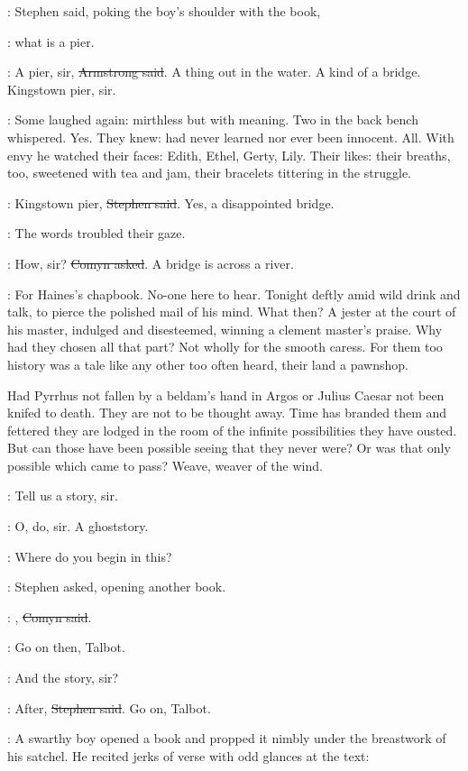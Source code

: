 :
Stephen said, poking the boy's shoulder with the book,

\Stephen:
what is a pier.

\armstrong:
A pier, sir, \sout{Armstrong said}.
A thing out in the water.
A kind of a bridge.
Kingstown pier, sir.


:
Some laughed again: mirthless but with meaning.
Two in the back bench whispered.
Yes.
They knew: had never learned nor ever been innocent.
All.
With envy he watched their faces: Edith, Ethel, Gerty, Lily.
Their likes: their breaths, too,
sweetened with tea and jam,
their bracelets tittering in the struggle.

\Stephen:
Kingstown pier, \sout{Stephen said}.
Yes, a disappointed bridge.

:
The words troubled their gaze.

\comyn:
How, sir?
\sout{Comyn asked}.
A bridge is across a river.

\StephenInt:
For Haines's chapbook.
No-one here to hear.
Tonight deftly amid wild drink and talk,
to pierce the polished mail of his mind.
What then?
A jester at the court of his master, 
indulged and disesteemed,
winning a clement master's praise.
Why had they chosen all that part?
Not wholly for the smooth caress.
For them too history was a tale like any other too often heard,
their land a pawnshop.

Had Pyrrhus not fallen by a beldam's hand in Argos
or Julius Caesar not been knifed to death.
They are not to be thought away.
Time has branded them
and fettered they are lodged in the room of the infinite possibilities
they have ousted.
But can those have been possible
seeing that they never were?
Or was that only possible which came to pass?
Weave, weaver of the wind.

\All:
Tell us a story, sir.

\All:
O, do, sir. A ghoststory.

\Stephen:
Where do you begin in this?

:
Stephen asked, opening another book.

\comyn:
, \sout{Comyn said}.

\Stephen:
Go on then, Talbot.

\talbot:
And the story, sir?

\Stephen:
After, \sout{Stephen said}.
Go on, Talbot.

:
A swarthy boy opened a book
and propped it nimbly under the breastwork of his satchel.
He recited jerks of verse with odd glances at the text:

